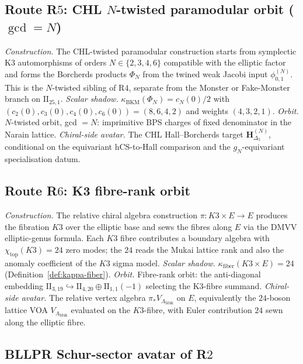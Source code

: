 \documentclass[11pt]{article}
\begin{document}
\subsection{Route R$5$: CHL $N$-twisted paramodular orbit ($\gcd = N$)}
\label{subsec:R5-CHL}

\emph{Construction.} The CHL-twisted paramodular construction
starts from symplectic K3 automorphisms of orders
$N\in\{2,3,4,6\}$ compatible with the elliptic factor and forms
the Borcherds products $\Phi_N$ from the twined weak Jacobi input
$\phi_{0,1}^{(N)}$. This is the $N$-twisted sibling of R$4$,
separate from the Monster or Fake-Monster branch on
$\mathrm{II}_{25,1}$.
\emph{Scalar shadow.}
$\kappa_{\mathrm{BKM}}(\Phi_N)=c_N(0)/2$ with
$(c_2(0),c_3(0),c_4(0),c_6(0))=(8,6,4,2)$ and weights
$(4,3,2,1)$.
\emph{Orbit.} $N$-twisted orbit, gcd $= N$: imprimitive BPS
charges of fixed denominator in the Narain lattice.
\emph{Chiral-side avatar.} The CHL Hall--Borcherds target
$\mathbf H_{\Delta_5}^{(N)}$, conditional on the equivariant
hCS-to-Hall comparison and the $g_N$-equivariant specialisation
datum.

\subsection{Route R$6$: K3 fibre-rank orbit}
\label{subsec:R6-fiber}

\emph{Construction.} The relative chiral algebra construction
$\pi \colon K3 \times E \to E$ produces the fibration
$K3$ over the elliptic base and sews the fibres along $E$ via the
DMVV elliptic-genus formula. Each $K3$ fibre contributes a
boundary algebra with $\chi_{\mathrm{top}}(K3) = 24$ zero modes;
the $24$ reads the Mukai lattice rank and also the anomaly
coefficient of the $K3$ sigma model.
\emph{Scalar shadow.}
$\kappa_{\mathrm{fiber}}(K3 \times E) = 24$
(Definition~\ref{def:kappa-fiber}).
\emph{Orbit.} Fibre-rank orbit: the anti-diagonal embedding
$\mathrm{II}_{3,19} \hookrightarrow \mathrm{II}_{4,20}
\oplus \mathrm{II}_{1,1}(-1)$ selecting the K3-fibre summand.
\emph{Chiral-side avatar.} The relative vertex algebra
$\pi_\ast V_{\Lambda_{\mathrm{Muk}}}$ on $E$, equivalently the
$24$-boson lattice VOA $V_{\Lambda_{\mathrm{Muk}}}$ evaluated on
the $K3$-fibre, with Euler contribution $24$ sewn along the
elliptic fibre.

\subsection{BLLPR Schur-sector avatar of R$2$}
\label{subsec:BLLPR-sixth}
\end{document}
